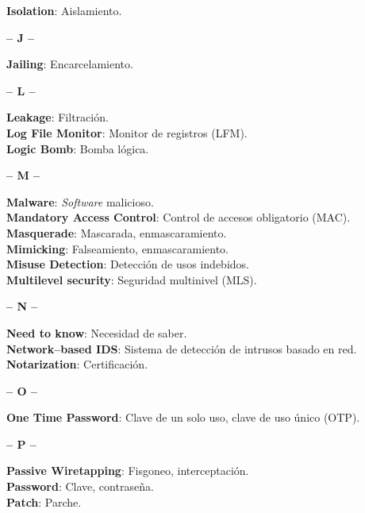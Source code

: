 {\bf Isolation}: Aislamiento.\\
\begin{center}
{\large {\bf -- J --}}\\
\end{center}
{\bf Jailing}: Encarcelamiento.\\
\begin{center}
{\large {\bf -- L --}}\\
\end{center}
{\bf Leakage}: Filtraci\'on.\\
{\bf Log File Monitor}: Monitor de registros (LFM).\\
{\bf Logic Bomb}: Bomba l\'ogica.\\
\begin{center}
{\large {\bf -- M --}}\\
\end{center}
{\bf Malware}: {\it Software} malicioso.\\
{\bf Mandatory Access Control}: Control de accesos obligatorio (MAC).\\
{\bf Masquerade}: Mascarada, enmascaramiento.\\
{\bf Mimicking}: Falseamiento, enmascaramiento.\\
{\bf Misuse Detection}: Detecci\'on de usos indebidos.\\
{\bf Multilevel security}: Seguridad multinivel (MLS).\\
\begin{center}
{\large {\bf -- N --}}\\
\end{center}
{\bf Need to know}: Necesidad de saber.\\
{\bf Network--based IDS}: Sistema de detecci\'on de intrusos basado en red.\\
{\bf Notarization}: Certificaci\'on.\\
\begin{center}
{\large {\bf -- O --}}\\
\end{center}
{\bf One Time Password}: Clave de un solo uso, clave de uso \'unico (OTP).\\
\begin{center}
{\large {\bf -- P --}}\\
\end{center}
{\bf Passive Wiretapping}: Fisgoneo, interceptaci\'on.\\
{\bf Password}: Clave, contrase\~na.\\
{\bf Patch}: Parche.\\
